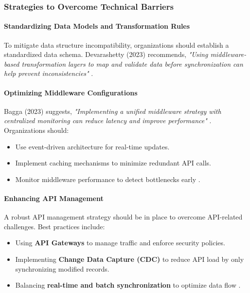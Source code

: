 \subsubsection{Strategies to Overcome Technical Barriers}

\paragraph{Standardizing Data Models and Transformation Rules} To mitigate data structure incompatibility, organizations should establish a standardized data schema. Devarashetty (2023) recommends, \textit{"Using middleware-based transformation layers to map and validate data before synchronization can help prevent inconsistencies"} \cite{devarashetty2023}.

\paragraph{Optimizing Middleware Configurations} Bagga (2023) suggests, \textit{"Implementing a unified middleware strategy with centralized monitoring can reduce latency and improve performance"} \cite{bagga2023}. Organizations should:
\begin{itemize}
\item Use event-driven architecture for real-time updates.
\item Implement caching mechanisms to minimize redundant API calls.
\item Monitor middleware performance to detect bottlenecks early \cite{bagga2023}.
\end{itemize}

\paragraph{Enhancing API Management} A robust API management strategy should be in place to overcome API-related challenges. Best practices include:
\begin{itemize}
\item Using \textbf{API Gateways} to manage traffic and enforce security policies.
\item Implementing \textbf{Change Data Capture (CDC)} to reduce API load by only synchronizing modified records.
\item Balancing \textbf{real-time and batch synchronization} to optimize data flow \cite{devarashetty2023}.
\end{itemize}

